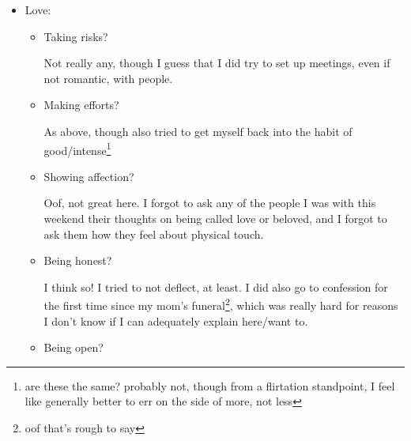 \documentclass[12pt]{article}
\renewcommand{\,}{\textsuperscript{,}}
\begin{document}
\begin{enumerate}
\begin{itemize}
\begin{itemize}
\begin{itemize}
\item I guess that the stuff for intro to quantum video counts here.

\end{itemize}

For now, not going to put deadlines, because don't really think that any are necessarily essential\footnote{that phrasing feels fundamentally wrong in some hard to pin down way}

\item Organizing citations?

I have not made progress on this, but would like to do so today.  
At the very least, as I read the rotational and quantum books, make sure that their info is in a new zotero folder.\footnote{which I'm going to shift all useful things into after making sure that I have good BibTeX keys for all of them}

\end{itemize}

\item Love:

\begin{itemize}

\item Taking risks?

Not really any, though I guess that I did try to set up meetings, even if not romantic, with people.

\item Making efforts?

As above, though also tried to get myself back into the habit of good/intense\footnote{are these the same? probably not, though from a flirtation standpoint, I feel like generally better to err on the side of more, not less}

\item Showing affection?

Oof, not great here.  
I forgot to ask any of the people I was with this weekend their thoughts on being called love or beloved, and I forgot to ask them how they feel about physical touch.

\item Being honest?

I think so! I tried to not deflect, at least.  
I did also go to confession for the first time since my mom's funeral\footnote{oof that's rough to say}, which was really hard for reasons I don't know if I can adequately explain here/want to.

\item Being open?


\end{itemize}
\end{itemize}
\end{enumerate}
\end{document}
